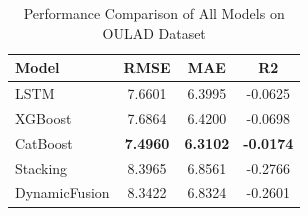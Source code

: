 \begin{table}[htbp]
\centering
\caption{Performance Comparison of All Models on OULAD Dataset}
\label{tab:main_results}
\begin{tabular}{lccc}
\hline
Model & RMSE & MAE & R2 \\
\hline
LSTM & 7.6601 & 6.3995 & -0.0625 \\
XGBoost & 7.6864 & 6.4200 & -0.0698 \\
CatBoost & \textbf{7.4960} & \textbf{6.3102} & \textbf{-0.0174} \\
Stacking & 8.3965 & 6.8561 & -0.2766 \\
DynamicFusion & 8.3422 & 6.8324 & -0.2601 \\
\hline
\end{tabular}
\end{table}

